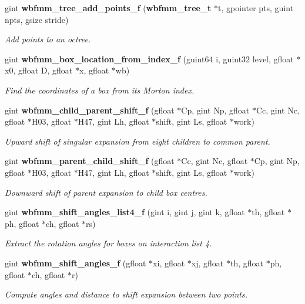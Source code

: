 \begin{DoxyCompactItemize}
gint {\bf wbfmm\+\_\+tree\+\_\+add\+\_\+points\+\_\+f} ({\bf wbfmm\+\_\+tree\+\_\+t} $\ast$t, gpointer pts, guint npts, gsize stride)
\begin{DoxyCompactList}\small\item\em Add points to an octree. \end{DoxyCompactList}\item 
gint {\bf wbfmm\+\_\+box\+\_\+location\+\_\+from\+\_\+index\+\_\+f} (guint64 i, guint32 level, gfloat $\ast$x0, gfloat D, gfloat $\ast$x, gfloat $\ast$wb)
\begin{DoxyCompactList}\small\item\em Find the coordinates of a box from its Morton index. \end{DoxyCompactList}\item 
gint {\bf wbfmm\+\_\+child\+\_\+parent\+\_\+shift\+\_\+f} (gfloat $\ast$Cp, gint Np, gfloat $\ast$Cc, gint Nc, gfloat $\ast$H03, gfloat $\ast$H47, gint Lh, gfloat $\ast$shift, gint Ls, gfloat $\ast$work)
\begin{DoxyCompactList}\small\item\em Upward shift of singular expansion from eight children to common parent. \end{DoxyCompactList}\item 
gint {\bf wbfmm\+\_\+parent\+\_\+child\+\_\+shift\+\_\+f} (gfloat $\ast$Cc, gint Nc, gfloat $\ast$Cp, gint Np, gfloat $\ast$H03, gfloat $\ast$H47, gint Lh, gfloat $\ast$shift, gint Ls, gfloat $\ast$work)
\begin{DoxyCompactList}\small\item\em Downward shift of parent expansion to child box centres. \end{DoxyCompactList}\item 
gint {\bf wbfmm\+\_\+shift\+\_\+angles\+\_\+list4\+\_\+f} (gint i, gint j, gint k, gfloat $\ast$th, gfloat $\ast$ph, gfloat $\ast$ch, gfloat $\ast$rs)
\begin{DoxyCompactList}\small\item\em Extract the rotation angles for boxes on interaction list 4. \end{DoxyCompactList}\item 
gint {\bf wbfmm\+\_\+shift\+\_\+angles\+\_\+f} (gfloat $\ast$xi, gfloat $\ast$xj, gfloat $\ast$th, gfloat $\ast$ph, gfloat $\ast$ch, gfloat $\ast$r)
\begin{DoxyCompactList}\small\item\em Compute angles and distance to shift expansion between two points. \end{DoxyCompactList}\item 

\end{DoxyCompactItemize}
